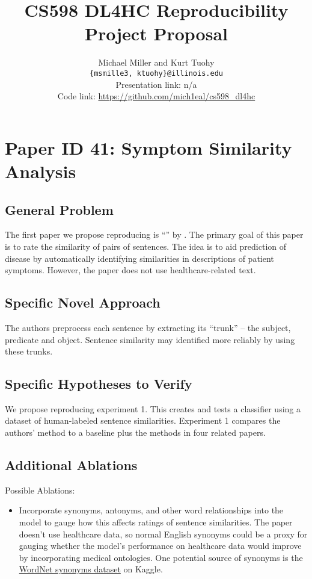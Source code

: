 \documentclass[11pt,a4paper]{article}
\title{CS598 DL4HC Reproducibility Project Proposal}
\author{Michael Miller and Kurt Tuohy \\
  \texttt{\{msmille3, ktuohy\}@illinois.edu}
  \\[2em]
  Presentation link: n/a\url{} \\
  Code link: \url{https://github.com/mich1eal/cs598_dl4hc}}
\begin{document}
\maketitle


\section{Paper ID 41: Symptom Similarity Analysis}
\subsection{General Problem}
The first paper we propose reproducing is ``'' by \citeauthor*{zhang_2019}. The primary goal of this paper is to rate the similarity of pairs of sentences. The idea is to aid prediction of disease by automatically identifying similarities in descriptions of patient symptoms. However, the paper does not use healthcare-related text.

\subsection{Specific Novel Approach}
The authors preprocess each sentence by extracting its ``trunk'' -- the subject, predicate and object. Sentence similarity may identified more reliably by using these trunks.

\subsection{Specific Hypotheses to Verify}
We propose reproducing experiment 1. This creates and tests a classifier using a dataset of human-labeled sentence similarities. Experiment 1 compares the authors' method to a baseline plus the methods in four related papers.

\subsection{Additional Ablations}
Possible Ablations:
\begin{itemize}
  \item Incorporate synonyms, antonyms, and other word relationships into the model to gauge how this affects ratings of sentence similarities. The paper doesn't use healthcare data, so normal English synonyms could be a proxy for gauging whether the model's performance on healthcare data would improve by incorporating medical ontologies. One potential source of synonyms is the \href{https://www.kaggle.com/datasets/duketemon/wordnet-synonyms}{WordNet synonyms dataset} on Kaggle.
\end{itemize}
\end{document}
